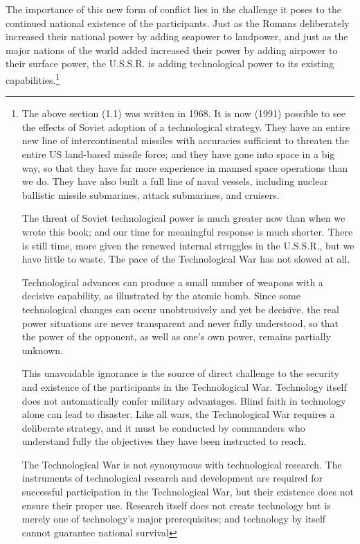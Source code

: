 The importance of this new form of conflict lies in the challenge it poses to the continued national existence of the participants. Just as the Romans deliberately increased their national power by adding seapower to landpower, and just as the major nations of the world added increased their power by adding airpower to their surface power, the U.S.S.R. is adding technological power to its existing capabilities.\footnote{
The above section (1.1) was written in 1968. It is now (1991) possible to see the effects of Soviet adoption of a technological strategy. They have an entire new line of intercontinental missiles with accuracies sufficient to threaten the entire US land-based missile force; and they have gone into space in a big way, so that they have far more experience in manned space operations than we do.
They have also built a full line of naval vessels, including nuclear ballistic missile submarines, attack submarines, and cruisers.

The threat of Soviet technological power is much greater now than when we wrote this book; and our time for meaningful response is much shorter. There is still time, more given the renewed internal struggles in the U.S.S.R., but we have little to waste. The pace of the Technological War has not slowed at all.

Technological advances can produce a small number of weapons with a decisive capability, as illustrated by the atomic bomb. Since some technological changes can occur unobtrusively and yet be decisive, the real power situations are never transparent and never fully understood, so that the power of the opponent, as well as one's own power, remains partially unknown.

This unavoidable ignorance is the source of direct challenge to the security and existence of the participants in the Technological War. Technology itself does not automatically confer military advantages. Blind faith in technology alone can lead to disaster. Like all wars, the Technological War requires a deliberate strategy, and it must be conducted by commanders who understand fully the objectives they have been instructed to reach.

The Technological War is not synonymous with technological research. The instruments of technological research and development are required for successful participation in the Technological War, but their existence does not ensure their proper use. Research itself does not create technology but is merely one of technology's major prerequisites; and technology by itself cannot guarantee national survival
}
